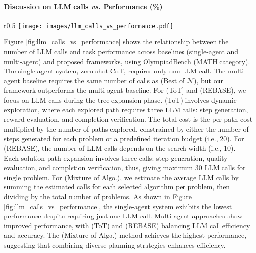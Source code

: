 

\paragraph{Discussion on LLM calls \textit{vs.} Performance (\%)}

\begin{wrapfigure}{r}{0.5\textwidth}
    \centering
    \vspace{-10mm}
    \texttt{[image: images/llm\_calls\_vs\_performance.pdf]}
    \caption{Comparison of baselines and our frameworks, showing the trade-off between LLM calls and performance (\%) for OlympiadBench (MATH).}
    \label{fig:llm_calls_vs_performance}
\end{wrapfigure}Figure \ref{fig:llm_calls_vs_performance} shows the relationship between the number of LLM calls and task performance across baselines (single-agent and multi-agent) and proposed frameworks, using OlympiadBench (MATH category). The single-agent system, zero-shot CoT, requires only one LLM call. The multi-agent baseline requires the same number of calls as \plangen{} (Best of $\mathcal{N}$), but our framework outperforms the multi-agent baseline. For \plangen{} (ToT) and \plangen{} (REBASE), we focus on LLM calls during the tree expansion phase. \plangen{} (ToT) involves dynamic exploration, where each explored path requires three LLM calls: step generation, reward evaluation, and completion verification. The total cost is the per-path cost multiplied by the number of paths explored, constrained by either the number of steps generated for each problem or a predefined iteration budget (i.e., 20). For \plangen{} (REBASE), the number of LLM calls depends on the search width (i.e., 10). Each solution path expansion involves three calls: step generation, quality evaluation, and completion verification, thus, giving maximum 30 LLM calls for single problem. For \plangen{} (Mixture of Algo.), we estimate the average LLM calls by summing the estimated calls for each selected algorithm per problem, then dividing by the total number of problems. As shown in Figure \ref{fig:llm_calls_vs_performance}, the single-agent system exhibits the lowest performance despite requiring just one LLM call. Multi-agent approaches show improved performance, with \plangen{} (ToT) and \plangen{} (REBASE) balancing LLM call efficiency and accuracy. The \plangen{} (Mixture of Algo.) method achieves the highest performance, suggesting that combining diverse planning strategies enhances efficiency.